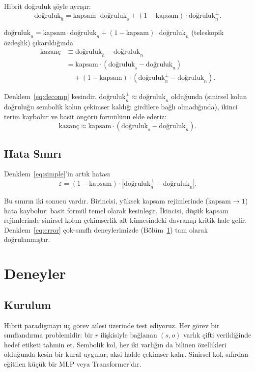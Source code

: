 \documentclass[11pt,a4paper]{article}
\begin{document}
Hibrit doğruluk şöyle ayrışır:
\begin{equation}
\text{doğruluk}_h = \text{kapsam} \cdot \text{doğruluk}_s
+ (1 - \text{kapsam}) \cdot \text{doğruluk}_n^{\perp}.
\end{equation}

$\text{doğruluk}_n = \text{kapsam} \cdot \text{doğruluk}_n
+ (1 - \text{kapsam}) \cdot \text{doğruluk}_n$ (teleskopik özdeşlik)
çıkarıldığında
\begin{align}
\text{kazanç} &\equiv \text{doğruluk}_h - \text{doğruluk}_n \nonumber \\
&= \text{kapsam} \cdot (\text{doğruluk}_s - \text{doğruluk}_n) \nonumber \\
&\quad + (1 - \text{kapsam}) \cdot
(\text{doğruluk}_n^{\perp} - \text{doğruluk}_n).
\label{eq:decomp}
\end{align}

Denklem~\ref{eq:decomp} kesindir. $\text{doğruluk}_n^{\perp} \approx
\text{doğruluk}_n$ olduğunda (sinirsel kolun doğruluğu sembolik kolun
çekimser kaldığı girdilere bağlı olmadığında), ikinci terim kaybolur
ve basit öngörü formülünü elde ederiz:
\begin{equation}
\text{kazanç} \approx \text{kapsam} \cdot
(\text{doğruluk}_s - \text{doğruluk}_n).
\label{eq:simple}
\end{equation}

\subsection{Hata Sınırı}
Denklem~\ref{eq:simple}'in artık hatası
\begin{equation}
\varepsilon = (1 - \text{kapsam}) \cdot
|\text{doğruluk}_n^{\perp} - \text{doğruluk}_n|.
\label{eq:error}
\end{equation}

Bu sınırın iki sonucu vardır. Birincisi, yüksek kapsam rejimlerinde
($\text{kapsam} \to 1$) hata kaybolur: basit formül temel olarak
kesinleşir. İkincisi, düşük kapsam rejimlerinde sinirsel kolun
çekimserlik alt kümesindeki davranışı kritik hale gelir.
Denklem~\ref{eq:error} çok-sınıflı deneylerimizde
(Bölüm~\ref{sec:deneyler}) tam olarak doğrulanmıştır.

\section{Deneyler}
\label{sec:deneyler}

\subsection{Kurulum}
Hibrit paradigmayı üç görev ailesi üzerinde test ediyoruz. Her görev
bir sınıflandırma problemidir: bir $r$ ilişkisiyle bağlanan
$(s, o)$ varlık çifti verildiğinde hedef etiketi tahmin et.
Sembolik kol, her iki varlığın da bilinen özellikleri olduğunda kesin
bir kural uygular; aksi halde çekimser kalır. Sinirsel kol, sıfırdan
eğitilen küçük bir MLP veya Transformer'dır.
\end{document}
